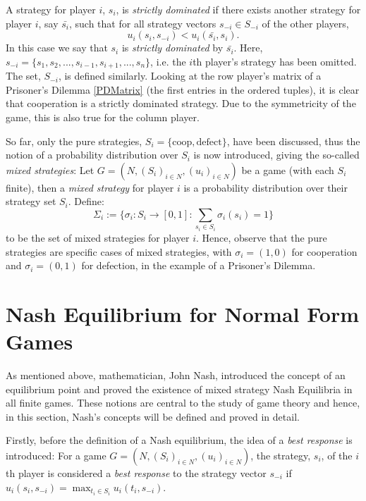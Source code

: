 A strategy for player $i$, $s_{i}$, is \textit{strictly dominated} if there
exists another strategy for player $i$, say $\bar{s_{i}}$, such that for all
strategy vectors $s_{-i} \in S_{-i}$ of the other players, 
$$
    u_{i}(s_{i}, s_{-i}) < u_{i}(\bar{s_{i}}, s_{i}).
$$
In this case we say that $s_{i}$ is \textit{strictly dominated} by
$\bar{s_{i}}$. Here, $s_{-i} = \{s_{1}, s_{2}, ..., s_{i-1}, s_{i+1}, ...,
s_{n}\}$, i.e. the $i$th player's strategy has been omitted. The set, $S_{-i}$,
is defined similarly. Looking at the row player's matrix of a Prisoner's Dilemma
\ref{PDMatrix} (the first entries in the ordered tuples), it is clear that
cooperation is a strictly dominated strategy. Due to the symmetricity of the
game, this is also true for the column player. \cite{maschler_solan_zamir_2013}



So far, only the pure strategies, $S_{i}=\{\text{coop}, \text{defect}\}$, have
been discussed, thus the notion of a probability distribution over $S_{i}$ is
now introduced, giving the so-called \textit{mixed strategies}:
Let $G=(N, (S_{i})_{i \in N}, (u_{i})_{i \in N})$ be a game (with each $S_{i}$
finite), then a \textit{mixed strategy} for player $i$ is a probability
distribution over their strategy set $S_{i}$. Define:
$$
\Sigma_{i} := \{\sigma_{i} : S_{i} \to [0, 1] : \sum_{s_{i} \in S_{i}}{\sigma_{i}(s_{i})} = 1\}   
$$
to be the set of mixed strategies for player $i$. Hence, observe that the pure
strategies are specific cases of mixed strategies, with $\sigma_{i} = (1, 0)$
for cooperation and $\sigma_{i} = (0, 1)$ for defection, in the example of a
Prisoner's Dilemma. \cite{maschler_solan_zamir_2013}

\section{Nash Equilibrium for Normal Form Games}
As mentioned above, mathematician, John Nash, introduced the concept of an
equilibrium point and proved the existence of mixed strategy Nash Equilibria in
all finite games. These notions are central to the study of game
theory \cite{maschler_solan_zamir_2013} and hence, in this section, Nash's
concepts will be defined and proved in detail.

Firstly, before the definition of a Nash equilibrium, the idea of a
\textit{best response} is introduced:
For a game $G=(N, (S_{i})_{i \in N}, (u_{i})_{i \in N})$, the strategy, $s_{i}$,
of the $i$th player is considered a \textit{best response} to the strategy
vector $s_{-i}$ if $u_{i}(s_{i}, s_{-i}) = \max_{t_{i} \in S_{i}}u_{i}(t_{i},
s_{-i})$. \cite{maschler_solan_zamir_2013}

